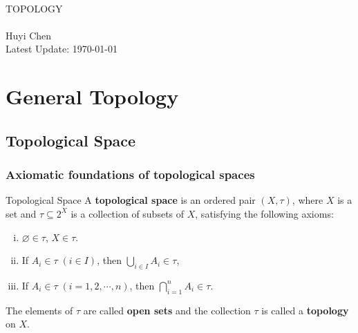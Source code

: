 \documentclass{report}
\begin{document}
\begin{titlepage}
	\begin{center}
		~\\
		\vspace{6em}
		\textsc{\Huge TOPOLOGY}
		~\\
		\vspace{2.5em}
		{\Large }
		~\\
		\vspace{6em}
		\textsf{Huyi Chen}
		~\\
		\vspace{5in}
		{\large Latest Update: \today}
	\end{center}
\end{titlepage}

\newpage
{}

\tableofcontents
\thispagestyle{empty}


\chapter{General Topology}
\setcounter{page}{1}


\section{Topological Space}
\subsection{Axiomatic foundations of topological spaces}
\begin{definition}{Topological Space}{}
	A \textbf{topological space} is an ordered pair $(X,\tau)$, where $X$ is a set and $\tau\subseteq2^X $ is a collection of subsets of $X$, satisfying the following axioms:
	\begin{enumerate}[(i)]
		\item $\varnothing\in \tau$, $X\in \tau$.
		\item If $A_i\in\tau\;(i\in I)$, then $\bigcup\limits_{i\in I}A_i\in \tau$,
		\item If $A_i\in\tau\;(i=1,2,\cdots,n)$, then $\bigcap\limits_{i=1}^nA_i\in \tau$.
	\end{enumerate}
	\noindent The elements of $\tau$ are called \textbf{open sets} and the collection $\tau$ is called a \textbf{topology} on $X$.
\end{definition}
\end{document}
